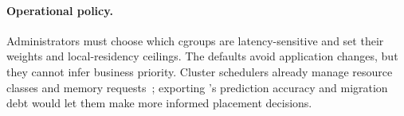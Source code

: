 \paragraph{Operational policy.}
Administrators must choose which cgroups are latency-sensitive and set their
weights and local-residency ceilings.  The defaults avoid application changes,
but they cannot infer business priority.  Cluster schedulers already manage
resource classes and memory requests~\cite{verma2015large}; exporting \system's
prediction accuracy and migration debt would let them make more informed
placement decisions.
